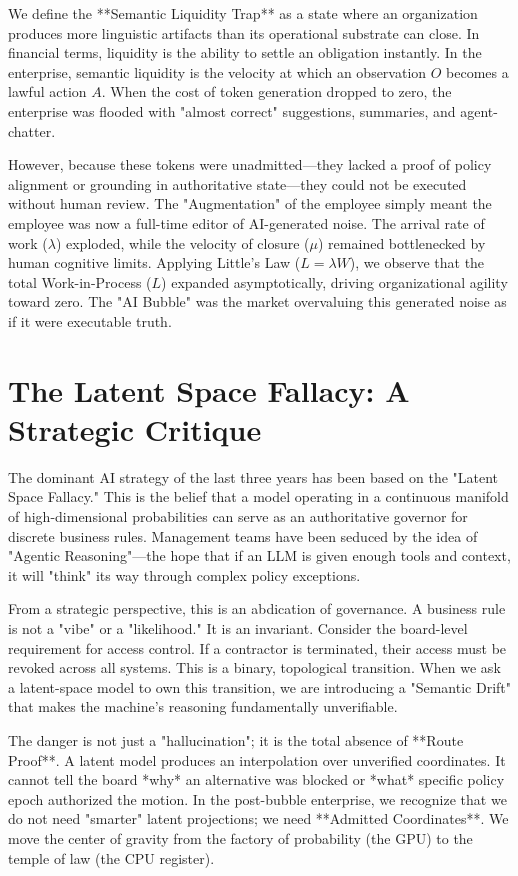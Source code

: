 \documentclass[12pt,a4paper,oneside]{book}
\begin{document}
We define the **Semantic Liquidity Trap** as a state where an organization produces more linguistic artifacts than its operational substrate can close. In financial terms, liquidity is the ability to settle an obligation instantly. In the enterprise, semantic liquidity is the velocity at which an observation $O$ becomes a lawful action $A$. When the cost of token generation dropped to zero, the enterprise was flooded with "almost correct" suggestions, summaries, and agent-chatter. 

However, because these tokens were unadmitted---they lacked a proof of policy alignment or grounding in authoritative state---they could not be executed without human review. The "Augmentation" of the employee simply meant the employee was now a full-time editor of AI-generated noise. The arrival rate of work ($\lambda$) exploded, while the velocity of closure ($\mu$) remained bottlenecked by human cognitive limits. Applying Little's Law ($L = \lambda W$), we observe that the total Work-in-Process ($L$) expanded asymptotically, driving organizational agility toward zero. The "AI Bubble" was the market overvaluing this generated noise as if it were executable truth.

\section{The Latent Space Fallacy: A Strategic Critique}
The dominant AI strategy of the last three years has been based on the "Latent Space Fallacy." This is the belief that a model operating in a continuous manifold of high-dimensional probabilities can serve as an authoritative governor for discrete business rules. Management teams have been seduced by the idea of "Agentic Reasoning"---the hope that if an LLM is given enough tools and context, it will "think" its way through complex policy exceptions.

From a strategic perspective, this is an abdication of governance. A business rule is not a "vibe" or a "likelihood." It is an invariant. Consider the board-level requirement for access control. If a contractor is terminated, their access must be revoked across all systems. This is a binary, topological transition. When we ask a latent-space model to own this transition, we are introducing a "Semantic Drift" that makes the machine's reasoning fundamentally unverifiable. 

The danger is not just a "hallucination"; it is the total absence of **Route Proof**. A latent model produces an interpolation over unverified coordinates. It cannot tell the board *why* an alternative was blocked or *what* specific policy epoch authorized the motion. In the post-bubble enterprise, we recognize that we do not need "smarter" latent projections; we need **Admitted Coordinates**. We move the center of gravity from the factory of probability (the GPU) to the temple of law (the CPU register).
\end{document}
